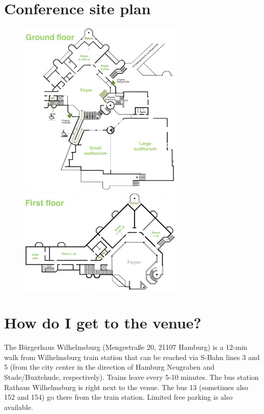 
\setlength{\parskip}{1em}   

\section*{Conference site plan}

\begin{figure}[H]
	\centering
	\includegraphics[width=0.7\textwidth]{tex/images/infos/ground_floor.png}
	\includegraphics[width=0.7\textwidth]{tex/images/infos/first_floor.png}
\end{figure}


\section*{How do I get to the venue?}

The Bürgerhaus Wilhelmsburg (Mengestraße 20, 21107 Hamburg) is a 12-min walk from Wilhelmsburg train station that can be reached via S-Bahn lines 3 and 5 (from the city center in the direction of Hamburg Neugraben and Stade/Buxtehude, respectively). Trains leave every 5-10 minutes. 
The bus station Rathaus Wilhelmsburg is right next to the venue. The bus 13 (sometimes also 152 and 154) go there from the train station.
Limited free parking is also available.

